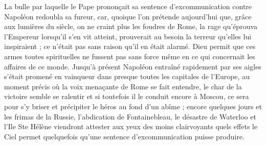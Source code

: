 \documentclass[11pt,a4paper]{report}
\begin{document}
La bulle par laquelle le Pape prononçait sa sentence d'excommunication contre Napoléon redoubla sa fureur, car, quoique l'on prétende aujourd'hui que, grâce aux lumières du siècle, on ne craint plus les foudres de Rome, la rage qu'éprouva l'Empereur lorsqu'il s'en vit atteint, prouverait au besoin la terreur qu'elles lui inspiraient ; ce n'était pas sans raison qu'il en était alarmé. Dieu permit que ces armes toutes spirituelles ne fussent pas sans force même en ce qui concernait les affaires de ce monde. Jusqu'à présent Napoléon entraîné rapidement par ses aigles s'était promené en vainqueur dans presque toutes les capitales de l'Europe, au moment précis où la voix menaçante de Rome se fait entendre, le char de la victoire semble se ralentir et si toutefois il le conduit encore à Moscou, ce sera pour s'y briser et précipiter le héros au fond d'un abîme ; encore quelques jours et les frimas de la Russie, l'abdication de Fontainebleau, le désastre de Waterloo et l'Ile Ste Hélène viendront attester aux yeux des moins clairvoyants quels effets le Ciel permet quelquefois qu'une sentence d'excommunication puisse produire.
\end{document}
